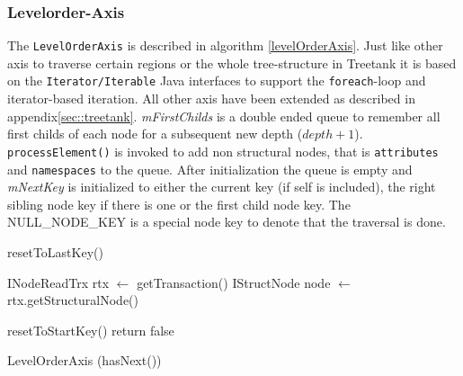 \subsubsection{Levelorder-Axis}\label{subsubsec::levelorderaxis}
The \texttt{LevelOrderAxis} is described in algorithm \ref{levelOrderAxis}. Just like other axis to traverse certain regions or the whole tree-structure in Treetank it is based on the \texttt{Iterator/Iterable} Java interfaces to support the \texttt{foreach}-loop and iterator-based iteration. All other axis have been extended as described in appendix\ref{sec::treetank}. \emph{mFirstChilds} is a double ended queue to remember all first childs of each node for a subsequent new depth ($depth + 1$). \texttt{processElement()} is invoked to add non structural nodes, that is \texttt{attributes} and \texttt{namespaces} to the queue. After initialization the queue is empty and \emph{mNextKey} is initialized to either the current key (if self is included), the right sibling node key if there is one or the first child node key. The NULL\_NODE\_KEY is a special node key to denote that the traversal is done.

\begin{algorithm}[Hhtbp]
{}
\BlankLine
{}
  
resetToLastKey()\;

INodeReadTrx rtx $\leftarrow$ getTransaction()\;
IStructNode node $\leftarrow$ rtx.getStructuralNode()\;






resetToStartKey()\;
return false\;
\caption{LevelOrderAxis (hasNext())}\label{levelOrderAxis}
\end{algorithm}

